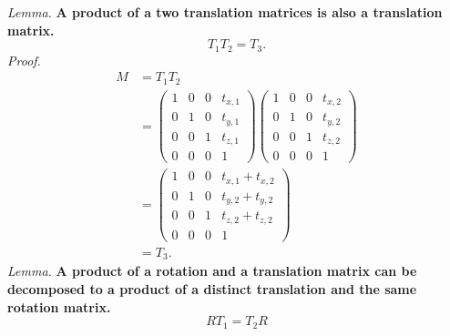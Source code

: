 \documentclass{article}
\begin{document}
\noindent
\textit{Lemma.} \textbf{A product of a two translation matrices is also a translation matrix.}
\begin{equation}
T_1 T_2 = T_3.
\end{equation}
\noindent
\textit{Proof.} 
\begin{align}
M &= T_1T_2 \\
&=
\begin{pmatrix}
1 & 0 & 0 & t_{x, 1}\\
0 & 1 & 0 & t_{y, 1}\\
0 & 0 & 1 & t_{z, 1}\\
0 & 0 & 0 & 1
\end{pmatrix}
\begin{pmatrix}
1 & 0 & 0 & t_{x, 2}\\
0 & 1 & 0 & t_{y, 2}\\
0 & 0 & 1 & t_{z, 2}\\
0 & 0 & 0 & 1
\end{pmatrix}\\
&= 
\begin{pmatrix}
1 & 0 & 0 & t_{x, 1} + t_{x, 2}\\
0 & 1 & 0 & t_{y, 2} + t_{y, 2}\\
0 & 0 & 1 & t_{z, 2} + t_{z, 2}\\
0 & 0 & 0 & 1
\end{pmatrix}\\
&= T_3.
\end{align}
\noindent
\textit{Lemma.}\textbf{ A product of a rotation and a translation matrix can be decomposed to a product of a distinct translation and the same rotation matrix.}
\begin{equation}
R T_1 = T_2 R
\end{equation}
\end{document}
